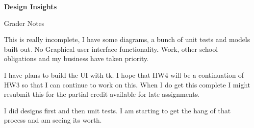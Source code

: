 \documentclass[12pt]{article}
\begin{document}
\begingroup
      \fontsize{14pt}{12pt}\selectfont

      \centerline{\textbf{Design Insights}} \par
\endgroup

Grader Notes

This is really incomplete, I have some diagrams, a bunch of unit tests and models built out.
No Graphical user interface functionality. Work, other school obligations and my business have taken priority.

I have plans to build the UI with tk. I hope that HW4 will be a continuation of HW3 so that I can continue to work on this.
When I do get this complete I might resubmit this for the partial credit available for late assignments.

I did designs first and then unit tests. I am starting to get the hang of that process and am seeing its worth.
\end{document}

